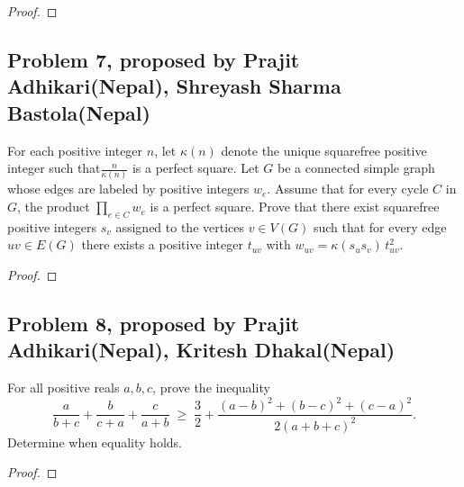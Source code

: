 \documentclass[11pt]{scrartcl}
\begin{document}
\begin{proof}
    
\end{proof}

\newpage{}

\subsection{Problem 7, proposed by Prajit Adhikari(Nepal), Shreyash Sharma Bastola(Nepal)}

\begin{problem}
    For each positive integer $n$, let $\kappa(n)$ denote the unique squarefree positive integer such that$\frac{n}{\kappa(n)}$ is a perfect square.
    Let $G$ be a connected simple graph whose edges are labeled by positive integers $w_e$. Assume that for every cycle $C$ in $G$, the product
    $\prod_{e\in C} w_e$ is a perfect square. Prove that there exist squarefree positive integers $s_v$ assigned to the vertices $v\in V(G)$ 
    such that for every edge $uv\in E(G)$ there exists a positive integer $t_{uv}$ with $w_{uv}=\kappa(s_us_v)\,t_{uv}^2$.
\end{problem}

\begin{proof}
    
\end{proof}

\newpage{}

\subsection{Problem 8, proposed by Prajit Adhikari(Nepal), Kritesh Dhakal(Nepal)}

\begin{problem}
    For all positive reals $a,b,c$, prove the inequality
    $$\frac{a}{b+c}+\frac{b}{c+a}+\frac{c}{a+b} \; \ge\; \frac32+\frac{(a-b)^2+(b-c)^2+(c-a)^2}{2(a+b+c)^2}.$$
    Determine when equality holds.
\end{problem}

\begin{proof}
    
\end{proof}
\end{document}
